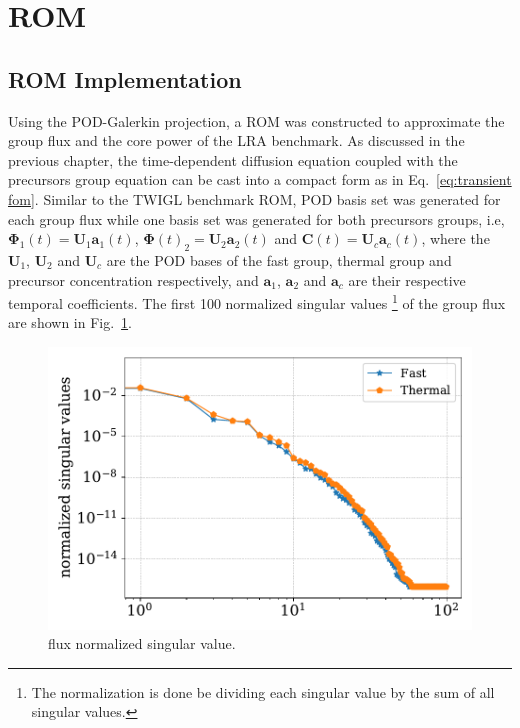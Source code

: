 \documentclass[]{interact}
\theoremstyle{plain}%
\theoremstyle{definition}
\theoremstyle{remark}
\begin{document}

\section{ROM }
\subsection{ROM Implementation}



Using the POD-Galerkin projection, a ROM was constructed to approximate the group flux and the core power of the LRA benchmark.
As discussed in the previous chapter, the time-dependent diffusion equation coupled with the precursors group equation can be cast into a compact form as in Eq.~\ref{eq:transient fom}.
Similar to the TWIGL benchmark ROM, POD basis set was generated for each group flux while one basis set was generated for both precursors groups, i.e, 
$\mathbf{\Phi}_1(t) = \mathbf{U}_1\mathbf{a}_1(t)$, $\mathbf{\Phi}(t)_2 = \mathbf{U}_2\mathbf{a}_2(t)$ and $\mathbf{C}(t) = \mathbf{U}_c\mathbf{a}_c(t)$, where the $\mathbf{U}_1$, $\mathbf{U}_2$  and $\mathbf{U}_c$ are the POD bases of the fast group, thermal group and precursor concentration respectively, and $\mathbf{a}_1$, $\mathbf{a}_2$ and $\mathbf{a}_c$ are their respective temporal coefficients. 
The first 100 normalized singular values \footnote{The normalization is done be dividing each singular value by the sum of all singular values.} of the group flux are shown in Fig.~\ref{fig:lra singular values}.
\begin{figure}[h!]
	\includegraphics[width=1.0\linewidth]{../figures/LRA_singular_values.pdf}
	\caption{flux normalized singular value.}
	\label{fig:lra singular values}
\end{figure}
\end{document}
